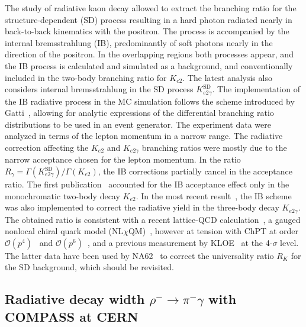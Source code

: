 The study of radiative kaon decay allowed to extract the branching ratio for
the structure-dependent (SD) process resulting in a hard photon radiated nearly
in back-to-back kinematics with the positron. The process is accompanied by the
internal bremsstrahlung (IB), predominantly of soft photons nearly in the
direction of the positron. In the overlapping regions both processes appear,
and the IB process is calculated and simulated as a background, and
conventionally included in the two-body branching ratio for $K_{e2}$.
The latest analysis also considers internal bremsstrahlung in the
SD process $K_{e2\gamma}^\mathrm{SD}$.
The implementation of the IB radiative process in the MC simulation
follows the scheme introduced by Gatti~\cite{gatti2006}, allowing for analytic
expressions of the differential branching ratio distributions to be used in an
event generator. The experiment data were
analyzed in terms of the lepton momentum in a narrow range. The radiative
correction affecting the $K_{e2}$ and $K_{e2\gamma}$
  branching ratios were mostly due to the narrow acceptance chosen for the
  lepton momentum. In the ratio
$R_\gamma = \Gamma(K_{e2\gamma}^\mathrm{SD})/\Gamma(K_{e2})$,
the IB corrections partially cancel in the acceptance ratio.
The first publication~\cite{e36_Ke2g_CsI}
accounted for the IB acceptance effect only in the
monochromatic two-body decay $K_{e2}$. In the most recent
result~\cite{e36_Ke2g_GSC}, the IB scheme was also
implemented to correct the radiative
yield in the three-body decay $K_{e2\gamma}$.
The obtained ratio is consistent with
a recent lattice-QCD calculation~\cite{latticeQCD}, a gauged nonlocal chiral
quark model (NL$\chi$QM)~\cite{NLchiQM},
however at tension with ChPT at order $\mathcal{O}(p^4)$~\cite{bijnens1993,daphne1995}
and $\mathcal{O}(p^6)$~\cite{chen2008}, and a previous
measurement by KLOE~\cite{KLOE} at the 4-$\sigma$ level.
The latter data have been
used by NA62~\cite{NA62} to correct the universality ratio $R_K$ for the SD
background, which should be revisited.

\subsection{Radiative decay width \texorpdfstring{$\rho^- \rightarrow \pi^- \gamma$}{rho- -> pi- g} with COMPASS at CERN}

